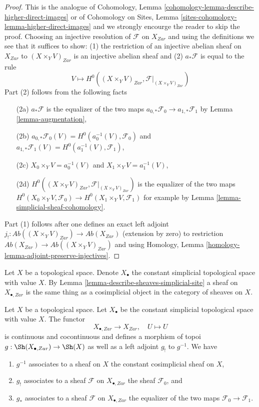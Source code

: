 \begin{proof}
This is the analogue of
Cohomology, Lemma \ref{cohomology-lemma-describe-higher-direct-images} or of
Cohomology on Sites, Lemma \ref{sites-cohomology-lemma-higher-direct-images}
and we strongly encourge the reader to skip the proof.
Choosing an injective resolution of $\mathcal{F}$ on
$X_{Zar}$ and using the definitions we see that it suffices to show:
(1) the restriction of an injective abelian
sheaf on $X_{Zar}$ to $(X \times_Y V)_{Zar}$ is an injective abelian sheaf and
(2) $a_*\mathcal{F}$ is equal to the rule
$$
V \longmapsto H^0((X \times_Y V)_{Zar}, \mathcal{F}|_{(X \times_Y V)_{Zar}})
$$
Part (2) follows from the following facts
\begin{enumerate}
\item[(2a)] $a_*\mathcal{F}$ is the equalizer of the two maps
$a_{0, *}\mathcal{F}_0 \to a_{1, *}\mathcal{F}_1$
by Lemma \ref{lemma-augmentation},
\item[(2b)] $a_{0, *}\mathcal{F}_0(V) =
H^0(a_0^{-1}(V), \mathcal{F}_0)$ and
$a_{1, *}\mathcal{F}_1(V) = H^0(a_1^{-1}(V), \mathcal{F}_1)$,
\item[(2c)] $X_0 \times_Y V = a_0^{-1}(V)$ and $X_1 \times_Y V = a_1^{-1}(V)$,
\item[(2d)] $H^0((X \times_Y V)_{Zar}, \mathcal{F}|_{(X \times_Y V)_{Zar}})$
is the equalizer of the two maps
$H^0(X_0 \times_Y V, \mathcal{F}_0) \to H^0(X_1 \times_Y V, \mathcal{F}_1)$
for example by Lemma \ref{lemma-simplicial-sheaf-cohomology}.
\end{enumerate}
Part (1) follows after one defines an exact left adjoint
$j_! : \textit{Ab}((X \times_Y V)_{Zar}) \to \textit{Ab}(X_{Zar})$
(extension by zero) to restriction
$\textit{Ab}(X_{Zar}) \to \textit{Ab}((X \times_Y V)_{Zar})$
and using Homology, Lemma \ref{homology-lemma-adjoint-preserve-injectives}.
\end{proof}

\noindent
Let $X$ be a topological space. Denote $X_\bullet$ the constant simplicial
topological space with value $X$. By
Lemma \ref{lemma-describe-sheaves-simplicial-site}
a sheaf on $X_{\bullet, Zar}$ is the same
thing as a cosimplicial object in the category of sheaves on $X$.

\begin{lemma}
\label{lemma-constant-simplicial-space}
Let $X$ be a topological space. Let $X_\bullet$ be the constant
simplicial topological space with value $X$. The functor
$$
X_{\bullet, Zar} \longrightarrow X_{Zar},\quad
U \longmapsto U
$$
is continuous and cocontinuous and defines a morphism of
topoi $g : \Sh(X_{\bullet, Zar}) \to \Sh(X)$ as well as a left adjoint
$g_!$ to $g^{-1}$. We have
\begin{enumerate}
\item $g^{-1}$ associates to a sheaf on $X$ the constant cosimplicial
sheaf on $X$,
\item $g_!$ associates to a sheaf $\mathcal{F}$ on $X_{\bullet, Zar}$ the
sheaf $\mathcal{F}_0$, and
\item $g_*$ associates to a sheaf $\mathcal{F}$ on $X_{\bullet, Zar}$ the
equalizer of the two maps $\mathcal{F}_0 \to \mathcal{F}_1$.
\end{enumerate}
\end{lemma}

